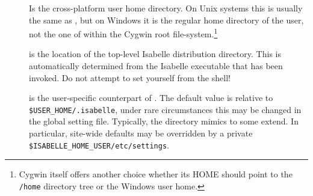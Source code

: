 \begin{isabellebody}
\begin{isamarkuptext}
\begin{description}
  \item[\hypertarget{setting.USER-HOME}{\hyperlink{setting.USER-HOME}{\mbox{}}}] Is the cross-platform
  user home directory.  On Unix systems this is usually the same as
  \hyperlink{setting.HOME}{\mbox{}}, but on Windows it is the regular home directory of
  the user, not the one of within the Cygwin root
  file-system.\footnote{Cygwin itself offers another choice whether
  its HOME should point to the \texttt{/home} directory tree or the
  Windows user home.}

 \item[\hypertarget{setting.ISABELLE-HOME}{\hyperlink{setting.ISABELLE-HOME}{\mbox{}}}] is the location of the
  top-level Isabelle distribution directory. This is automatically
  determined from the Isabelle executable that has been invoked.  Do
  not attempt to set \hyperlink{setting.ISABELLE-HOME}{\mbox{}} yourself from the shell!
  
  \item[\hypertarget{setting.ISABELLE-HOME-USER}{\hyperlink{setting.ISABELLE-HOME-USER}{\mbox{}}}] is the user-specific
  counterpart of \hyperlink{setting.ISABELLE-HOME}{\mbox{}}. The default value is
  relative to \verb|$USER_HOME/.isabelle|, under rare
  circumstances this may be changed in the global setting file.
  Typically, the \hyperlink{setting.ISABELLE-HOME-USER}{\mbox{}} directory mimics
  \hyperlink{setting.ISABELLE-HOME}{\mbox{}} to some extend. In particular, site-wide
  defaults may be overridden by a private \verb|$ISABELLE_HOME_USER/etc/settings|.
  

\end{description}
\end{isamarkuptext}
\end{isabellebody}
